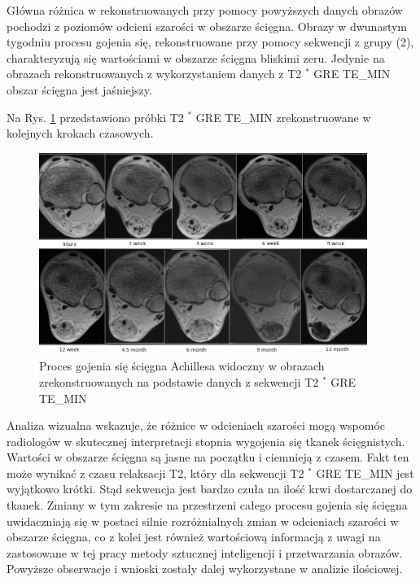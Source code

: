 Główna różnica w rekonstruowanych przy pomocy powyższych danych obrazów pochodzi z poziomów odcieni szarości w obszarze ścięgna. Obrazy w dwunastym tygodniu procesu gojenia się, rekonstruowane przy pomocy sekwencji z grupy (2), charakteryzują się wartościami w obszarze ścięgna bliskimi zeru. Jedynie na obrazach rekonstruowanych z wykorzystaniem danych z T2 $^\ast$ GRE TE\_MIN obszar ścięgna jest jaśniejszy. 

Na Rys. \ref{fig:T2comp} przedstawiono próbki T2 $^\ast$ GRE TE\_MIN zrekonstruowane w kolejnych krokach czasowych.

\begin{figure}[h]
	\centering
	\includegraphics[width=0.95\textwidth]{figures/T2gremin.png}
	\caption{Proces gojenia się ścięgna Achillesa widoczny w obrazach zrekonstruowanych na podstawie danych z sekwencji T2 $^\ast$ GRE TE\_MIN}\label{fig:T2comp}
\end{figure}

Analiza wizualna wskazuje, że różnice w odcieniach szarości mogą wspomóc radiologów w skutecznej interpretacji stopnia wygojenia się tkanek ścięgnistych. Wartości w obszarze ścięgna są jasne na początku i ciemnieją z czasem. Fakt ten może wynikać z czasu relaksacji T2, który dla sekwencji T2 $^\ast$ GRE TE\_MIN jest wyjątkowo krótki. Stąd sekwencja jest bardzo czuła na ilość krwi dostarczanej do tkanek. Zmiany w tym zakresie na przestrzeni całego procesu gojenia się ścięgna uwidaczniają się w postaci silnie rozróżnialnych zmian w odcieniach szarości w obszarze ścięgna, co z kolei jest również wartościową informacją z uwagi na zastosowane w tej pracy metody sztucznej inteligencji i przetwarzania obrazów. Powyższe obserwacje i wnioski zostały dalej wykorzystane w analizie ilościowej.

